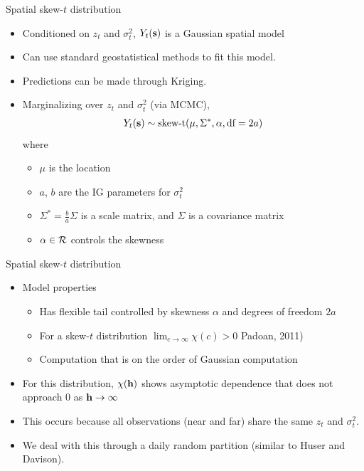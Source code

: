 \documentclass{beamer}
\begin{document}
\begin{frame}{Spatial skew-$t$ distribution}
  \begin{itemize} \setlength{\itemsep}{0.5em}
   \item \alert{Conditioned} on $z_t$ and $\sigma^2_t$, $Y_t(\mbox{\bf s})$ is a Gaussian spatial model
    \item Can use standard geostatistical methods to fit this model.
    \item Predictions can be made through Kriging.
    \item \alert{Marginalizing} over $z_t$ and $\sigma^2_t$ (via MCMC),
    \begin{align*}
      Y_t(\mbox{\bf s}) \sim \text{skew-t}(\mu, \Sigma^*, \alpha, \text{df}=2a)
    \end{align*}
    where
    \begin{itemize}
    	\item $\mu$ is the location
	\item $a$, $b$ are the IG parameters for $\sigma^2_t$
	\item $\Sigma^* = \frac{ b }{ a } \Sigma$ is a scale matrix, and $\Sigma$ is a \Matern covariance matrix
	\item $\alpha \in {\cal R}$ controls the skewness
    \end{itemize}
  \end{itemize}
\end{frame}

\begin{frame}{Spatial skew-$t$ distribution}
  \begin{itemize} \setlength{\itemsep}{0.5em}
      \item Model properties
    \begin{itemize}
    	\item Has flexible tail controlled by skewness $\alpha$ and degrees of freedom $2a$
    	\item For a skew-$t$ distribution $\lim_{c \rightarrow \infty} \chi(c) > 0$ Padoan, 2011)
    	\item Computation that is on the order of Gaussian computation
    \end{itemize}
    \item For this distribution, $\chi(\mbox{\bf h})$ shows asymptotic dependence that does not approach 0 as $\mbox{\bf h} \rightarrow \infty$
   \item This occurs because all observations (near and far) share the same $z_t$ and $\sigma_t^2$.
    \item We deal with this through a daily random partition (similar to Huser and Davison).
  \end{itemize}
\end{frame}
\end{document}
